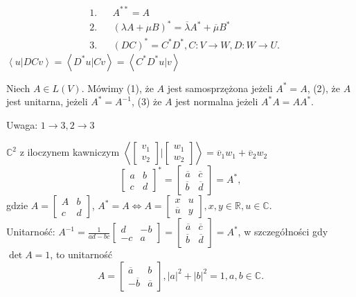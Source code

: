 \documentclass[../main.tex]{subfiles}
\begin{document}
\begin{align*}
    &1. &&A^{**} = A\\
    &2. &&\left( \lambda A + \mu B \right) ^* = \overline{\lambda}A^* + \overline{\mu} B^*\\
    &3. &&\left( D C \right) ^* = C^* D^*, C: V\to W, D: W\to U
.\end{align*}
$\left<u|DC v \right> = \left<D^* u | C v \right> = \left<C^* D^* u | v \right>$
\begin{definicja}
    Niech $A\in L(V)$. Mówimy (1), że $A$ jest samosprzężona jeżeli $A^* = A$, (2), że $A$ jest unitarna, jeżeli $A^* = A^{-1}$, (3) że $A$ jest normalna jeżeli $A^*A = AA^*$.
\end{definicja}
Uwaga: $1\to 3, 2\to 3$
\begin{przyklad}
    $\mathbb{C}^2$ z iloczynem kawniczym $\left<\begin{bmatrix} v_1\\v_2 \end{bmatrix} | \begin{bmatrix} w_1\\w_2 \end{bmatrix}  \right> = \overline{v}_1 w_1 + \overline{v}_2 w_2$ \\
    \[
        \begin{bmatrix} a&b\\c&d \end{bmatrix}^* = \begin{bmatrix} \overline{a} & \overline{c} \\ \overline{b} & \overline{d} \end{bmatrix} = A^*
,\]
gdzie $A = \begin{bmatrix} A&b\\c&d \end{bmatrix} $, $A^* = A \iff A = \begin{bmatrix} x&u\\ \overline{u} & y \end{bmatrix} , x,y\in \mathbb{R}, u\in \mathbb{C}$.\\
Unitarność: $A^{-1} = \frac{1}{ad-bc}\begin{bmatrix} d&-b\\-c&a \end{bmatrix} = \begin{bmatrix} \overline{a}&\overline{c}\\ \overline{b} & \overline{d} \end{bmatrix} = A^*$, w szczegółności gdy $\det A = 1$, to unitarność
\[
    A = \begin{bmatrix} \overline{a} & b \\ -\overline{b} & \overline{a} \end{bmatrix} , |a|^2 + |b|^2 = 1, a,b\in \mathbb{C}
.\]
\end{przyklad}
\end{document}
